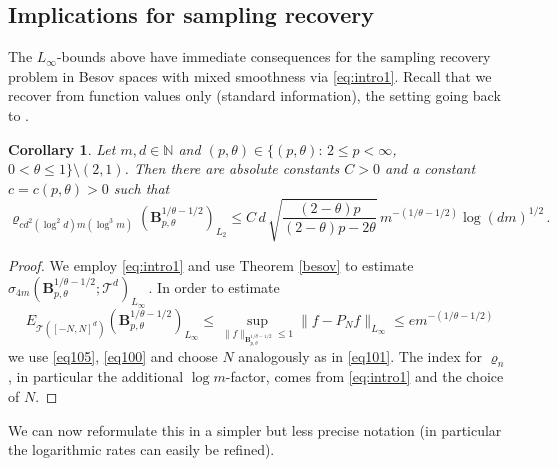 \documentclass[11pt,reqno]{article}
\numberwithin{equation}{section}
\theoremstyle{definition}
\theoremstyle{plain}
\newtheorem{cor}[satz]{Corollary}
\newcommand{\N}{\ensuremath{\mathbb{N}}}
\begin{document}
\subsection{Implications for sampling recovery}


The $L_\infty$-bounds above have immediate consequences for the sampling recovery problem in Besov spaces with mixed smoothness via \eqref{eq:intro1}. Recall that we recover from function values only (standard information), the setting going back to \cite{WaWo01}.

\begin{cor}\label{cor:besov} Let \(m,d \in \N\) and $(p,\theta)\in \{(p,\theta) : \, 2\leq p<\infty$, $0<\theta\leq 1\} \setminus (2,1)$. Then there are absolute constants $C>0$ and a constant $c=c(p,\theta)>0$ such that 
$$
    \varrho_{cd^2(\log^2d)m(\log^3m)}(\mathbf{B}^{1/\theta-1/2}_{p,\theta})_{L_2} 
    \leq C\,d\,\sqrt{\frac{(2-\theta)p}{(2-\theta)p-2\theta}}\,m^{-(1/\theta-1/2)}\log(dm)^{1/2}\,.
$$ 
\end{cor} 
\begin{proof} We employ \eqref{eq:intro1} and use Theorem \ref{besov} to estimate $\sigma_{4m}(\mathbf{B}^{1/\theta-1/2}_{p,\theta};\mathcal{T}^d)_{L_\infty}\,.$ In order to estimate 
$$
    E_{\mathcal{T}([-N,N]^d)}(\mathbf{B}^{1/\theta-1/2}_{p,\theta})_{L_\infty} \leq \sup\limits_{\|f\|_{\mathbf{B}^{1/\theta-1/2}_{p,\theta}} \leq 1} \|f-P_Nf\|_{L_\infty} \leq e m^{-(1/\theta-1/2)}
$$
we use \eqref{eq105}, \eqref{eq100} and choose $N$ analogously as in \eqref{eq101}. The index for $\varrho_n$, in particular the additional $\log m$-factor, comes from \eqref{eq:intro1} and the choice of $N$.   
\end{proof}
We can now reformulate this in a simpler but less precise notation (in particular the logarithmic rates can easily be refined).
\end{document}
